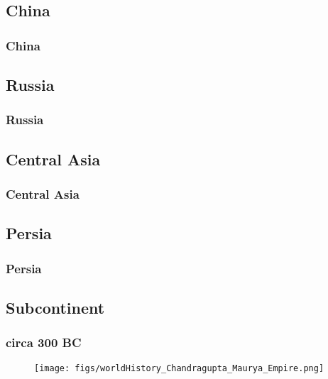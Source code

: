 \subsection{China}
\begin{frame}\frametitle{China}\logoEvolution
\end{frame}

\subsection{Russia}
\begin{frame}\frametitle{Russia}\logoEvolution

\end{frame}

\subsection{Central Asia}
\begin{frame}\frametitle{Central Asia}\logoEvolution

\end{frame}

\subsection{Persia}
\begin{frame}\frametitle{Persia}\logoEvolution

\end{frame}

\subsection{Subcontinent}
\begin{frame}\frametitle{circa 300 BC}\logoEvolution
	\begin{figure}
		\texttt{[image: figs/worldHistory\_Chandragupta\_Maurya\_Empire.png]}
	\end{figure}
\end{frame}

